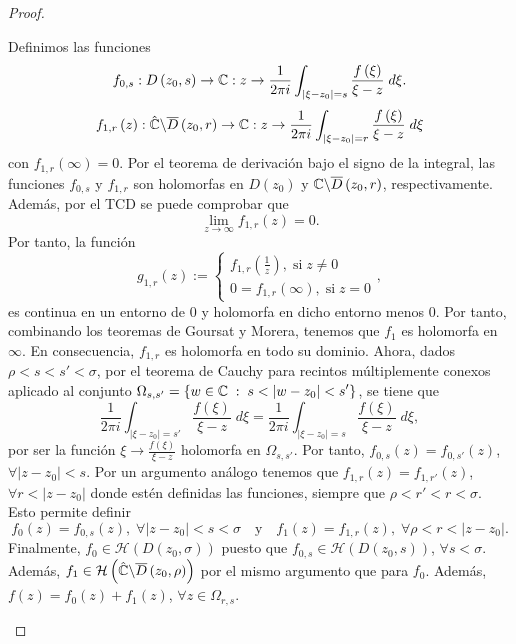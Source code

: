 \begin{proof}
\begin{description}
Definimos las funciones 
\[f_{0,s} : D\left(z_{0}, s\right)\to \mathbb{C}: z \to\frac{1}{2\pi i}\int _{ \left|\xi-z_{0}\right| = s}\frac{f\left(\xi\right)}{\xi - z} \; d\xi  .\]
\[f_{1,r}\left(z\right): \hat{\mathbb{C}} \backslash \overline{D}\left(z_{0}, r\right)\to \mathbb{C} : z \to \frac{1}{2\pi i}\int _{ \left|\xi-z_{0}\right|=r}\frac{f\left(\xi\right)}{\xi - z} \; d\xi\]
con $\displaystyle f_{1,r}\left(\infty \right)= 0 $. Por el teorema de derivación bajo el signo de la integral, las funciones $\displaystyle f_{0,s} $ y $\displaystyle f_{1,r}  $ son holomorfas en $\displaystyle D\left(z_{0}\right) $ y $\displaystyle \mathbb{C}\backslash \overline{D}\left(z_{0}, r\right) $, respectivamente.
Además, por el TCD se puede comprobar que 
\[\lim_{z \to \infty}f_{1,r}\left(z\right)=0 .\]
Por tanto, la función
\[g_{1,r}\left(z\right):=
\begin{cases}
f_{1,r}\left(\frac{1}{z}\right), \; \text{si} \; z \neq 0 \\
0 = f_{1,r}\left(\infty\right), \; \text{si} \; z = 0
\end{cases}
,\]
es continua en un entorno de 0 y holomorfa en dicho entorno menos 0. Por tanto, combinando los teoremas de Goursat y Morera, tenemos que $\displaystyle f_{1} $ es holomorfa en $\displaystyle \infty  $. En consecuencia, $\displaystyle f_{1,r} $ es holomorfa en todo su dominio. 
Ahora, dados $\displaystyle \rho < s < s' < \sigma  $, por el teorema de Cauchy para recintos múltiplemente conexos aplicado al conjunto $\displaystyle \Omega _{s,s'}=\left\{ w \in \mathbb{C} \; : \; s < \left|w-z_{0}\right|<s'\right\}  $, se tiene que
\[\frac{1}{2\pi i}\int _{ \left|\xi-z_{0}\right|= s'}\frac{f\left(\xi\right)}{\xi-z} \; d\xi = \frac{1}{2\pi i}\int _{ \left|\xi-z_{0}\right| = s}\frac{f\left(\xi\right)}{\xi-z} \; d\xi ,\]
por ser la función $\displaystyle \xi \to \frac{f\left(\xi\right)}{\xi - z} $ holomorfa en $\displaystyle \Omega_{s,s'} $. Por tanto, $\displaystyle f_{0,s}\left(z\right)=f_{0,s'}\left(z\right) $, $\displaystyle \forall \left|z-z_{0}\right|<s $. Por un argumento análogo tenemos que $\displaystyle f_{1,r}\left(z\right)=f_{1,r'}\left(z\right) $, $\displaystyle \forall r < \left|z-z_{0}\right| $ donde estén definidas las funciones, siempre que $\displaystyle \rho < r' < r < \sigma  $. Esto permite definir
\[f_{0}\left(z\right)=f_{0,s}\left(z\right), \; \forall \left|z-z_{0}\right|<s < \sigma \quad \text{y}\quad f_{1}\left(z\right)=f_{1,r}\left(z\right), \; \forall \rho < r < \left|z-z_{0}\right| .\]
Finalmente, $\displaystyle f_{0}\in \mathcal{H}\left(D\left(z_{0}, \sigma\right)\right) $ puesto que $\displaystyle f_{0,s}\in \mathcal{H}\left(D\left(z_{0}, s\right)\right) $, $\displaystyle \forall s < \sigma  $. Además, $\displaystyle f_{1}\in \mathcal{H}\left(\hat{\mathbb{C}}\backslash\overline{D}\left(z_{0}, \rho\right)\right) $ por el mismo argumento que para $\displaystyle f_{0} $. Además, $\displaystyle f\left(z\right) = f_{0}\left(z\right) + f_{1}\left(z\right) $, $\displaystyle \forall z \in \Omega_{r,s} $.
	\end{description}
\end{proof}
